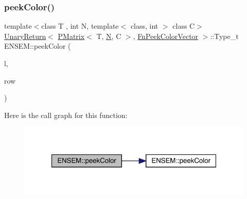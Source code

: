 \subsubsection{\texorpdfstring{peekColor()}{peekColor()}\hspace{0.1cm}{\footnotesize\ttfamily [1/2]}}
{\footnotesize\ttfamily template$<$class T , int N, template$<$ class, int $>$ class C$>$ \\
\mbox{\hyperlink{structENSEM_1_1UnaryReturn}{Unary\+Return}}$<$ \mbox{\hyperlink{classENSEM_1_1PMatrix}{P\+Matrix}}$<$ T, \mbox{\hyperlink{adat__devel_2lib_2hadron_2operator__name__util_8cc_a7722c8ecbb62d99aee7ce68b1752f337}{N}}, C $>$, \mbox{\hyperlink{structENSEM_1_1FnPeekColorVector}{Fn\+Peek\+Color\+Vector}} $>$\+::Type\+\_\+t E\+N\+S\+E\+M\+::peek\+Color (\begin{DoxyParamCaption}\item[{const \mbox{\hyperlink{classENSEM_1_1PMatrix}{P\+Matrix}}$<$ T, \mbox{\hyperlink{adat__devel_2lib_2hadron_2operator__name__util_8cc_a7722c8ecbb62d99aee7ce68b1752f337}{N}}, C $>$ \&}]{l,  }\item[{int}]{row }\end{DoxyParamCaption})\hspace{0.3cm}{\ttfamily [inline]}}

Here is the call graph for this function\+:\nopagebreak
\begin{figure}[H]
\begin{center}
\leavevmode
\includegraphics[width=321pt]{df/d0a/group__primmatrix_ga95fe2504ecc461173cb780afe6dbbbf4_cgraph}
\end{center}
\end{figure}
\mbox{\label{group__primmatrix_gaa9e8d0698d08d9e4b6924a14192c17b4}} 
